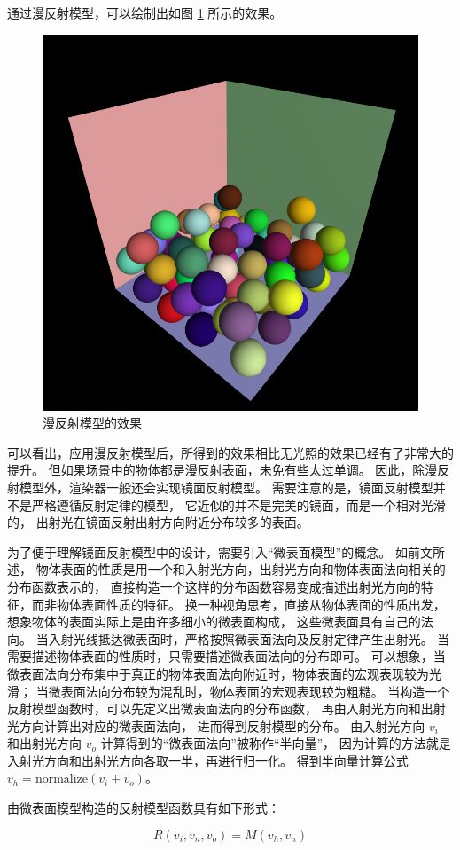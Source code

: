 \documentclass[fontset=windows]{ctexart}
\begin{document}
通过漫反射模型，可以绘制出如图 \ref{fig-gl:lambertian-model} 所示的效果。

\begin{figure}[htbp]
    \centering
    \includegraphics[width=0.5\linewidth]{imgs/sec 7.1/lighting.png}
    \caption{漫反射模型的效果}
    \label{fig-gl:lambertian-model}
\end{figure}

可以看出，应用漫反射模型后，所得到的效果相比无光照的效果已经有了非常大的提升。
但如果场景中的物体都是漫反射表面，未免有些太过单调。
因此，除漫反射模型外，渲染器一般还会实现镜面反射模型。
需要注意的是，镜面反射模型并不是严格遵循反射定律的模型，
它近似的并不是完美的镜面，而是一个相对光滑的，
出射光在镜面反射出射方向附近分布较多的表面。

为了便于理解镜面反射模型中的设计，需要引入“微表面模型”的概念。
如前文所述，
物体表面的性质是用一个和入射光方向，出射光方向和物体表面法向相关的分布函数表示的，
直接构造一个这样的分布函数容易变成描述出射光方向的特征，而非物体表面性质的特征。
换一种视角思考，直接从物体表面的性质出发，
想象物体的表面实际上是由许多细小的微表面构成，
这些微表面具有自己的法向。
当入射光线抵达微表面时，严格按照微表面法向及反射定律产生出射光。
当需要描述物体表面的性质时，只需要描述微表面法向的分布即可。
可以想象，当微表面法向分布集中于真正的物体表面法向附近时，物体表面的宏观表现较为光滑；
当微表面法向分布较为混乱时，物体表面的宏观表现较为粗糙。
当构造一个反射模型函数时，可以先定义出微表面法向的分布函数，
再由入射光方向和出射光方向计算出对应的微表面法向，
进而得到反射模型的分布。
由入射光方向 $v_i$ 和出射光方向 $v_o$ 计算得到的“微表面法向”被称作“半向量”，
因为计算的方法就是入射光方向和出射光方向各取一半，再进行归一化。
得到半向量计算公式 $v_{h} = \text{normalize}(v_i + v_o)$。

由微表面模型构造的反射模型函数具有如下形式：

$$
R(v_i, v_n, v_o) = M(v_h, v_n)
$$
\end{document}
